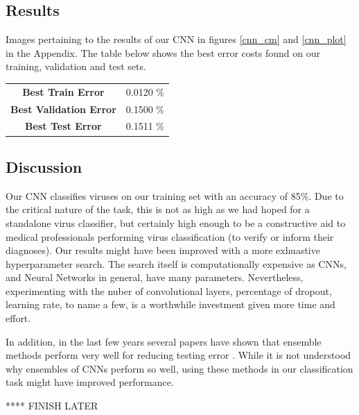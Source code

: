\subsection{Results}
Images pertaining to the results of our CNN in figures \ref{cnn_cm} and \ref{cnn_plot} in the Appendix. The table below shows the best error costs found on our training, validation and test sets. 

\begin{center}
\begin{tabular}{ c c }
 \textbf{Best Train Error} 			& 0.0120 \% \\ 
 \textbf{Best Validation Error}     & 0.1500 \% \\  
 \textbf{Best Test Error} 			& 0.1511 \%   
\end{tabular}
\end{center}

\subsection{Discussion}
Our CNN classifies viruses on our training set with an accuracy of 85\%. Due to the critical nature of the task, this is not as high as we had hoped for a standalone virus classifier, but certainly high enough to be a constructive aid to medical professionals performing virus classification (to verify or inform their diagnoses). Our results might have been improved with a more exhuastive hyperparameter search. The search itself is computationally expensive as CNNs, and Neural Networks in general, have many parameters. Nevertheless, experimenting with the nuber of convolutional layers, percentage of dropout, learning rate, to name a few, is a worthwhile investment given more time and effort. 

In addition, in the last few years several papers have shown that ensemble methods perform very well for reducing testing error \citet{chenlearning}. While it is not understood why ensembles of CNNs perform so well, using these methods in our classification task might have improved performance.

**** FINISH LATER

